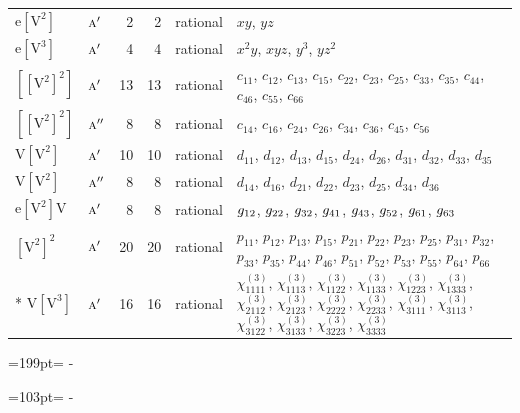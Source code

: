 \documentclass[10pt,a4paper]{article}
\newcommand{\needspace}[1]{\par\penalty-100\begingroup\dimen0=#1\relax\dimen2=\pagegoal
  \advance\dimen2-\pagetotal\ifdim\dimen0>\dimen2\relax\ifdim\dimen2>0pt\vfil\break\fi\fi
  \endgroup}
\numberwithin{equation}{section}
\newcommand{\irr}[1]{\text{\normalfont\scshape #1}}
\newcommand{\jahn}[1]{\mathrm{#1}}
\newlength{\fillwidth}\newlength{\cellwidth}\newlength{\colwidth}
\begin{document}
{\begin{longtable}{@{}llrrl>{\RaggedRight\arraybackslash}p{\fillwidth}@{}}
$\jahn{e[V^{2}]}$ & $\irr{a}'$ & 2 & 2 & rational & $xy$, $yz$\\
$\jahn{e[V^{3}]}$ & $\irr{a}'$ & 4 & 4 & rational & $x^{2}y$, $xyz$, $y^{3}$, $yz^{2}$\\
$\jahn{[[V^{2}]^{2}]}$ & $\irr{a}'$ & 13 & 13 & rational & $c_{11}$, $c_{12}$, $c_{13}$, $c_{15}$, $c_{22}$, $c_{23}$, $c_{25}$, $c_{33}$, $c_{35}$, $c_{44}$, $c_{46}$, $c_{55}$, $c_{66}$\\
$\jahn{[[V^{2}]^{2}]}$ & $\irr{a}''$ & 8 & 8 & rational & $c_{14}$, $c_{16}$, $c_{24}$, $c_{26}$, $c_{34}$, $c_{36}$, $c_{45}$, $c_{56}$\\
$\jahn{V[V^{2}]}$ & $\irr{a}'$ & 10 & 10 & rational & $d_{11}$, $d_{12}$, $d_{13}$, $d_{15}$, $d_{24}$, $d_{26}$, $d_{31}$, $d_{32}$, $d_{33}$, $d_{35}$\\
$\jahn{V[V^{2}]}$ & $\irr{a}''$ & 8 & 8 & rational & $d_{14}$, $d_{16}$, $d_{21}$, $d_{22}$, $d_{23}$, $d_{25}$, $d_{34}$, $d_{36}$\\
$\jahn{e[V^{2}]V}$ & $\irr{a}'$ & 8 & 8 & rational & $\mathnormal{g}_{12}$, $\mathnormal{g}_{22}$, $\mathnormal{g}_{32}$, $\mathnormal{g}_{41}$, $\mathnormal{g}_{43}$, $\mathnormal{g}_{52}$, $\mathnormal{g}_{61}$, $\mathnormal{g}_{63}$\\
$\jahn{[V^{2}]^{2}}$ & $\irr{a}'$ & 20 & 20 & rational & $p_{11}$, $p_{12}$, $p_{13}$, $p_{15}$, $p_{21}$, $p_{22}$, $p_{23}$, $p_{25}$, $p_{31}$, $p_{32}$, $p_{33}$, $p_{35}$, $p_{44}$, $p_{46}$, $p_{51}$, $p_{52}$, $p_{53}$, $p_{55}$, $p_{64}$, $p_{66}$\\*
$\jahn{V[V^{3}]}$ & $\irr{a}'$ & 16 & 16 & rational & $\chi^{(3)}_{1111}$, $\chi^{(3)}_{1113}$, $\chi^{(3)}_{1122}$, $\chi^{(3)}_{1133}$, $\chi^{(3)}_{1223}$, $\chi^{(3)}_{1333}$, $\chi^{(3)}_{2112}$, $\chi^{(3)}_{2123}$, $\chi^{(3)}_{2222}$, $\chi^{(3)}_{2233}$, $\chi^{(3)}_{3111}$, $\chi^{(3)}_{3113}$, $\chi^{(3)}_{3122}$, $\chi^{(3)}_{3133}$, $\chi^{(3)}_{3223}$, $\chi^{(3)}_{3333}$\\
\bottomrule\end{longtable}}
\needspace{199pt}
\needspace{103pt}
\end{document}
